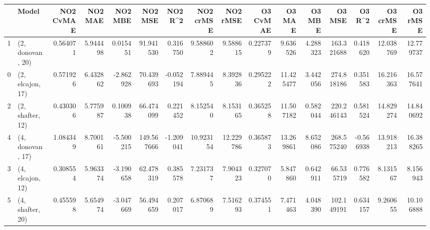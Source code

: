 \begin{tabular}{llrrrrrrrrrrrrrr}
\toprule
{} &             Model &  NO2 CvMAE &   NO2 MAE &   NO2 MBE &     NO2 MSE &   NO2 R\textasciicircum2 &  NO2 crMSE &   NO2 rMSE &  O3 CvMAE &     O3 MAE &    O3 MBE &      O3 MSE &    O3 R\textasciicircum2 &   O3 crMSE &    O3 rMSE \\
\midrule
1 &  (2, donovan, 20) &   0.564071 &  5.944498 &  0.015451 &   91.941530 &  0.316750 &   9.588602 &   9.588615 &  0.227379 &   9.636526 &  4.288323 &  163.321688 &  0.418620 &  12.038769 &  12.779737 \\
0 &  (2, elcajon, 17) &   0.571926 &  6.432862 & -2.862928 &   70.439693 & -0.052194 &   7.889445 &   8.392836 &  0.295222 &  11.425477 &  3.442056 &  274.818186 &  0.351583 &  16.216363 &  16.577641 \\
2 &  (2, shafter, 12) &   0.430306 &  5.775987 &  0.100938 &   66.474099 &  0.221452 &   8.152540 &   8.153165 &  0.365258 &  11.507182 &  0.582044 &  220.246143 &  0.581524 &  14.829274 &  14.840692 \\
4 &  (4, donovan, 17) &   1.084349 &  8.700161 & -5.500215 &  149.567666 & -1.209041 &  10.923154 &  12.229786 &  0.365873 &  13.269861 &  8.652086 &  268.575240 & -0.566938 &  13.918213 &  16.388265 \\
3 &  (4, elcajon, 12) &   0.308554 &  5.963374 & -3.190658 &   62.478319 &  0.385578 &   7.231737 &   7.904323 &  0.327070 &   5.847860 &  0.642911 &   66.535719 &  0.776582 &   8.131567 &   8.156943 \\
5 &  (4, shafter, 20) &   0.455598 &  5.654974 & -3.047669 &   56.494659 &  0.207017 &   6.870689 &   7.516293 &  0.374551 &   7.471463 &  4.048390 &  102.149191 &  0.634157 &   9.260655 &  10.106888 \\
\bottomrule
\end{tabular}
